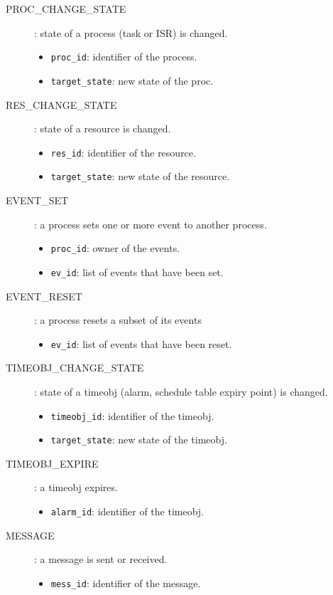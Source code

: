 \begin{description}
  \item[PROC\_CHANGE\_STATE]: state of a process (task or ISR) is changed.
    \begin{itemize}
      \item \texttt{proc\_id}: identifier of the process.
      \item \texttt{target\_state}: new state of the proc. %
    \end{itemize}

  \item[RES\_CHANGE\_STATE]: state of a resource is changed.
    \begin{itemize}
      \item \texttt{res\_id}: identifier of the resource.
      \item \texttt{target\_state}: new state of the resource. %
    \end{itemize}

  \item[EVENT\_SET]: a process sets one or more event to another process.
    \begin{itemize}
      \item \texttt{proc\_id}: owner of the events.
      \item \texttt{ev\_id}: list of events that have been set.
    \end{itemize}

  \item[EVENT\_RESET]: a process resets a subset of its events
    \begin{itemize}
      \item \texttt{ev\_id}: list of events that have been reset.
    \end{itemize}

  \item[TIMEOBJ\_CHANGE\_STATE]: state of a timeobj (alarm, schedule table
    expiry point) is changed.
    \begin{itemize}
      \item \texttt{timeobj\_id}: identifier of the timeobj.
      \item \texttt{target\_state}: new state of the timeobj.
    \end{itemize}

  \item[TIMEOBJ\_EXPIRE]: a timeobj expires.
    \begin{itemize}
      \item \texttt{alarm\_id}: identifier of the timeobj.
    \end{itemize}

  \item[MESSAGE]: a message is sent or received.
  \begin{itemize}
  	\item \texttt{mess\_id}: identifier of the message.
  \end{itemize}
  

\end{description}

